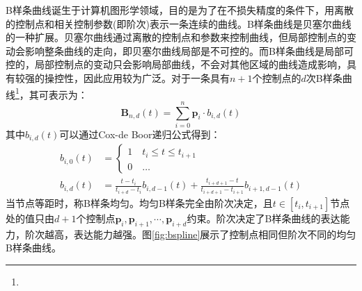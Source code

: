 B样条曲线诞生于计算机图形学领域，目的是为了在不损失精度的条件下，用离散的控制点和相关控制参数(即阶次)表示一条连续的曲线。B样条曲线是贝塞尔曲线的一种扩展。贝塞尔曲线通过离散的控制点和参数来控制曲线，但局部控制点的变动会影响整条曲线的走向，即贝塞尔曲线局部是不可控的。而B样条曲线是局部可控的，局部控制点的变动只会影响局部曲线，不会对其他区域的曲线造成影响，具有较强的操控性，因此应用较为广泛。对于一条具有$n+1$个控制点的$d$次B样条曲线\footnote{}，其可表示为：
\begin{equation}
  \label{equ:b_spline_origin}
  \boldsymbol{B}_{n,d}(t)=\sum_{i=0}^{n}\boldsymbol{p}_i\cdot b_{i,d}(t)
\end{equation}
其中$b_{i,d}(t)$可以通过Cox-de Boor递归公式\cite{de1978practical}得到：
\begin{equation*}
  \begin{aligned}
    b_{i,0}(t) & =\begin{cases}
                    1\quad t_i\le t\le t_{i+1} \\
                    0\quad\dots
                  \end{cases}                                                                \\
    b_{i,d}(t) & =\frac{t-t_i}{t_{i+d}-t_i}b_{i,d-1}(t)+\frac{t_{i+d+1}-t}{t_{i+d+1}-t_{i+1}}b_{i+1,d-1}(t)
  \end{aligned}
\end{equation*}
当节点等距时，称B样条均匀。均匀B样条完全由阶次决定，且$t\in[t_i,t_{i+1}]$节点处的值只由$d+1$个控制点$\boldsymbol{p}_i,\boldsymbol{p}_{i+1},\cdots,\boldsymbol{p}_{i+d}$约束。阶次决定了B样条曲线的表达能力，阶次越高，表达能力越强。图\ref{fig:bspline}展示了控制点相同但阶次不同的均匀B样条曲线。

